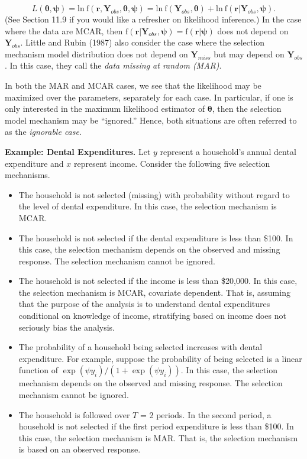 \begin{equation*}
L(\boldsymbol \theta, \boldsymbol \psi) = \mathrm{ln~}
\mathrm{f}(\mathbf{r}, \mathbf{Y}_{obs}, \boldsymbol \theta,
\boldsymbol \psi) = \mathrm{ln~} \mathrm{f}(\mathbf{Y}_{obs},
\boldsymbol \theta) + \mathrm{ln~} \mathrm{f}(\mathbf{r} |
\mathbf{Y}_{obs}, \boldsymbol \psi).
\end{equation*}
(See Section 11.9 if you would like a refresher on likelihood
inference.) In the case where the data are MCAR, then
$\mathrm{f}(\mathbf{r} | \mathbf{Y}_{obs}, \boldsymbol \psi) =
\mathrm{f}(\mathbf{r} | \boldsymbol \psi)$ does not depend on
$\mathbf{Y}_{obs}$. Little and Rubin (1987) also consider the case
where the selection mechanism model distribution does not depend on
$\mathbf{Y}_{miss}$ but may depend on $\mathbf{Y}_{obs}$. In this
case, they call the \emph{data missing at random
(MAR)}.

In both the MAR and MCAR cases, we see that the likelihood may be
maximized over the parameters, separately for each case. In
particular, if one is only interested in the maximum likelihood
estimator of $\boldsymbol \theta$, then the selection model
mechanism may be ``ignored.'' Hence, both situations are often
referred to as the \emph{ignorable case}.

\linejed{}

\textbf{Example: Dental Expenditures.} Let $y$ represent a household's annual dental
expenditure and $x$ represent income. Consider the following five
selection mechanisms.
\begin{itemize}
  \item The household is not selected (missing) with probability without
regard to the level of dental expenditure. In this case, the
selection mechanism is MCAR.
  \item The household is not selected if the dental expenditure is less
than \$100. In this case, the selection mechanism depends on the
observed and missing response. The selection mechanism cannot be
ignored.
  \item The household is not selected if the income is less
than \$20,000. In this case, the selection mechanism is MCAR,
covariate dependent. That is, assuming that the purpose of the
analysis is to understand dental expenditures conditional on
knowledge of income, stratifying based on income does not seriously
bias the analysis.
  \item The probability of a household being selected increases
with dental expenditure. For example, suppose the probability of
being selected is a linear function of $\exp(\psi  y_i)/(1+ \exp
(\psi y_i))$. In this case, the selection mechanism depends on the
observed and missing response. The selection mechanism cannot be
ignored.
  \item The household is followed over $T$ = 2
periods. In the second period, a household is not selected if the
first period expenditure is less than \$100. In this case, the
selection mechanism is MAR. That is, the selection mechanism is
based on an observed response.
\end{itemize}

